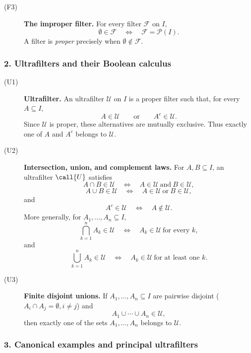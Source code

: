 {\begin{description}
    \item[\textnormal{(F3)}] \textbf{The improper filter.}
    For every filter \(\mathcal{F}\) on \(I\),
    \[
    \emptyset\in\mathcal{F}
    \quad\Longleftrightarrow\quad
    \mathcal{F}=\mathcal{P}(I).
    \]
    A filter is \emph{proper} precisely when
    \(\emptyset\notin\mathcal{F}\).
\end{description}

\subsubsection*{2. Ultrafilters and their Boolean calculus}

\begin{description}
    \item[\textnormal{(U1)}] \textbf{Ultrafilter.}
    An ultrafilter \(\mathcal{U}\) on \(I\) is a proper filter such that, for
    every \(A\subseteq I\),
    \[
    A\in\mathcal{U}
    \qquad\text{or}\qquad
    A^c\in\mathcal{U}.
    \]
    Since \(\mathcal{U}\) is proper, these alternatives are mutually
    exclusive. Thus exactly one of \(A\) and \(A^c\) belongs to
    \(\mathcal{U}\).

    \item[\textnormal{(U2)}] \textbf{Intersection, union, and complement laws.}
    For \(A,B\subseteq I\), an ultrafilter $\call{U}$ satisfies
    \[
    A\cap B\in\mathcal{U}
    \quad\Longleftrightarrow\quad
    A\in\mathcal{U}\ \text{and}\ B\in\mathcal{U},
    \]
    \[
    A\cup B\in\mathcal{U}
    \quad\Longleftrightarrow\quad
    A\in\mathcal{U}\ \text{or}\ B\in\mathcal{U},
    \]
    and
    \[
    A^c\in\mathcal{U}
    \quad\Longleftrightarrow\quad
    A\notin\mathcal{U}.
    \]
    More generally, for \(A_1,\ldots,A_n\subseteq I\),
    \[
    \bigcap_{k=1}^{n}A_k\in\mathcal{U}
    \quad\Longleftrightarrow\quad
    A_k\in\mathcal{U}\ \text{for every }k,
    \]
    and
    \[
    \bigcup_{k=1}^{n}A_k\in\mathcal{U}
    \quad\Longleftrightarrow\quad
    A_k\in\mathcal{U}\ \text{for at least one }k.
    \]

    \item[\textnormal{(U3)}] \textbf{Finite disjoint unions.}
    If \(A_1,\ldots,A_n\subseteq I\) are pairwise disjoint ($A_i \cap A_j = \emptyset, i\neq j$) and
    \[
    A_1\cup\cdots\cup A_n\in\mathcal{U},
    \]
    then exactly one of the sets \(A_1,\ldots,A_n\) belongs to
    \(\mathcal{U}\).
\end{description}

\subsubsection*{3. Canonical examples and principal ultrafilters}

}
